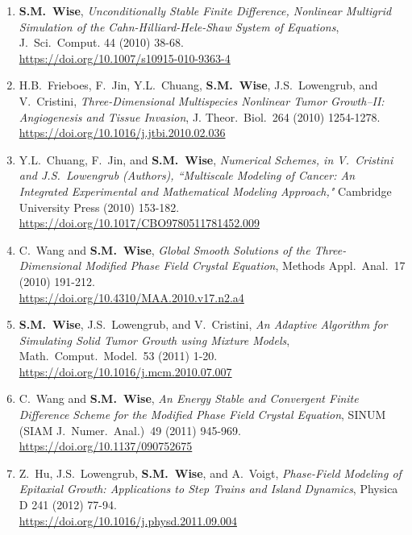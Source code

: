 \documentclass[11pt]{letter}
\begin{document}
\begin{enumerate}
    \item
\textbf{S.M.~Wise}, {\sl Unconditionally Stable Finite Difference, Nonlinear Multigrid Simulation of the Cahn-Hilliard-Hele-Shaw System of Equations}, J.~Sci.~Comput. 44 (2010) 38-68.
	\\
\url{https://doi.org/10.1007/s10915-010-9363-4}
	\item
H.B.~Frieboes, F.~Jin, Y.L.~Chuang, \textbf{S.M.~Wise}, J.S.~Lowengrub, and V.~Cristini, {\sl Three-Dimensional Multispecies Nonlinear Tumor Growth--II: Angiogenesis and Tissue Invasion}, J. Theor.~Biol.~264 (2010) 1254-1278.
	\\
\url{https://doi.org/10.1016/j.jtbi.2010.02.036}

	\item
Y.L.~Chuang, F.~Jin, and \textbf{S.M.~Wise}, {\sl Numerical Schemes, in V.~Cristini and J.S.~Lowengrub (Authors), ``Multiscale Modeling of Cancer: An Integrated Experimental and Mathematical Modeling Approach,"} Cambridge University Press (2010) 153-182.
	\\
\url{https://doi.org/10.1017/CBO9780511781452.009}

	\item
C.~Wang and \textbf{S.M.~Wise}, {\sl Global Smooth Solutions of the Three-Dimensional Modified Phase Field Crystal Equation}, Methods Appl.~Anal.~17 (2010) 191-212.
	\\
\url{https://doi.org/10.4310/MAA.2010.v17.n2.a4}

    \item
\textbf{S.M.~Wise}, J.S.~Lowengrub, and V.~Cristini, {\sl An Adaptive Algorithm for Simulating Solid Tumor Growth using Mixture Models}, Math.~Comput.~Model.~53 (2011) 1-20.
	\\
\url{https://doi.org/10.1016/j.mcm.2010.07.007}
 
	\item
C.~Wang and \textbf{S.M.~Wise}, {\sl An Energy Stable and Convergent Finite Difference Scheme for the Modified Phase Field Crystal Equation}, SINUM (SIAM J.~Numer.~Anal.)~49 (2011) 945-969.
	\\
\url{https://doi.org/10.1137/090752675}

	\item
Z.~Hu, J.S.~Lowengrub, \textbf{S.M.~Wise}, and A.~Voigt, {\sl Phase-Field Modeling of Epitaxial Growth: Applications to Step Trains and Island Dynamics}, Physica D 241 (2012) 77-94.
	\\
\url{https://doi.org/10.1016/j.physd.2011.09.004}


\end{enumerate}
\end{document}
